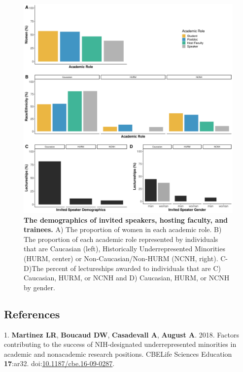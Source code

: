 \documentclass[10pt,]{article}
\begin{document}
\begin{figure}
\centering
\includegraphics{Figure_1.jpg}
\caption{\textbf{The demographics of invited speakers, hosting faculty,
and trainees.} A) The proportion of women in each academic role. B) The
proportion of each academic role represented by individuals that are
Caucasian (left), Historically Underrepresented Minorities (HURM,
center) or Non-Caucasian/Non-HURM (NCNH, right). C-D)The percent of
lectureships awarded to individuals that are C) Caucasian, HURM, or NCNH
and D) Caucasian, HURM, or NCNH by gender.}
\end{figure}

\newpage

\subsection{References}\label{references}

\hypertarget{refs}{}
\hypertarget{ref-Martinez2018}{}
1. \textbf{Martinez LR}, \textbf{Boucaud DW}, \textbf{Casadevall A},
\textbf{August A}. 2018. Factors contributing to the success of
NIH-designated underrepresented minorities in academic and nonacademic
research positions. CBELife Sciences Education \textbf{17}:ar32.
doi:\href{https://doi.org/10.1187/cbe.16-09-0287}{10.1187/cbe.16-09-0287}.
\end{document}
